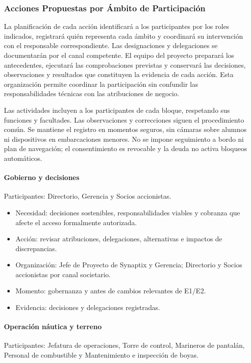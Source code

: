 \subsubsection{Acciones Propuestas por Ámbito de Participación}
La planificación de cada acción identificará a los participantes por los roles indicados, registrará quién representa cada ámbito y coordinará su intervención con el responsable correspondiente. Las designaciones y delegaciones se documentarán por el canal competente. El equipo del proyecto preparará los antecedentes, ejecutará las comprobaciones previstas y conservará las decisiones, observaciones y resultados que constituyen la evidencia de cada acción. Esta organización permite coordinar la participación sin confundir las responsabilidades técnicas con las atribuciones de negocio.

Las actividades incluyen a los participantes de cada bloque, respetando sus funciones y facultades. Las observaciones y correcciones siguen el procedimiento común. Se mantiene el registro en momentos seguros, sin cámaras sobre alumnos ni dispositivos en embarcaciones menores. No se impone seguimiento a bordo ni plan de navegación; el consentimiento es revocable y la deuda no activa bloqueos automáticos.

\paragraph{Gobierno y decisiones}
\mbox{}\par
\noindent Participantes: Directorio, Gerencia y Socios accionistas.

\begin{itemize}
  \setlength{\itemsep}{2pt}
  \setlength{\parsep}{0pt}
  \item Necesidad: decisiones sostenibles, responsabilidades viables y cobranza que afecte el acceso formalmente autorizada.
  \item Acción: revisar atribuciones, delegaciones, alternativas e impactos de discrepancias.
  \item Organización: Jefe de Proyecto de Synaptix y Gerencia; Directorio y Socios accionistas por canal societario.
  \item Momento: gobernanza y antes de cambios relevantes de E1/E2.
  \item Evidencia: decisiones y delegaciones registradas.
\end{itemize}

\paragraph{Operación náutica y terreno}
\mbox{}\par
\noindent Participantes: Jefatura de operaciones, Torre de control, Marineros de pantalán, Personal de combustible y Mantenimiento e inspección de boyas.

